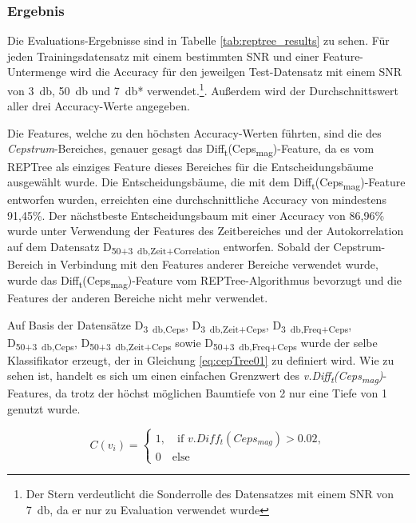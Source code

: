 \subsubsection{Ergebnis} 
\label{sec:vad_result}

Die Evaluations-Ergebnisse  sind in Tabelle \ref{tab:reptree_results} zu sehen. Für jeden Trainingsdatensatz mit einem bestimmten SNR und einer Feature-Untermenge wird die Accuracy für den jeweilgen Test-Datensatz mit einem SNR von \SI{3}{\decibel}, \SI{50}{\decibel} und \SI{7}{\decibel}* verwendet.\footnote{Der Stern verdeutlicht die Sonderrolle des  Datensatzes mit einem SNR von \SI{7}{\decibel}, da er nur zu Evaluation verwendet wurde }. Außerdem wird der Durchschnittswert aller drei Accuracy-Werte angegeben.

Die Features, welche zu den höchsten Accuracy-Werten führten, sind die des \emph{Cepstrum}-Bereiches, genauer gesagt das Diff\textsubscript{t}(Ceps\textsubscript{mag})-Feature, da es vom REPTree als einziges Feature dieses Bereiches für die Entscheidungsbäume ausgewählt wurde. Die Entscheidungsbäume, die mit dem Diff\textsubscript{t}(Ceps\textsubscript{mag})-Feature entworfen wurden, erreichten eine durchschnittliche Accuracy von mindestens 91,45\%. Der nächstbeste Entscheidungsbaum mit einer Accuracy von 86,96\% wurde unter Verwendung der Features des Zeitbereiches und der Autokorrelation auf dem Datensatz D\textsubscript{50+\SI{3}{\decibel},Zeit+Correlation} entworfen. Sobald der Cepstrum-Bereich in Verbindung mit den Features anderer Bereiche verwendet wurde, wurde das Diff\textsubscript{t}(Ceps\textsubscript{mag})-Feature vom REPTree-Algorithmus bevorzugt und die Features der anderen Bereiche nicht mehr verwendet.

Auf Basis der Datensätze D\textsubscript{\SI{3}{\decibel},Ceps}, D\textsubscript{\SI{3}{\decibel},Zeit+Ceps}, D\textsubscript{\SI{3}{\decibel},Freq+Ceps}, D\textsubscript{50+\SI{3}{\decibel},Ceps}, D\textsubscript{50+\SI{3}{\decibel},Zeit+Ceps} sowie D\textsubscript{50+\SI{3}{\decibel},Freq+Ceps} wurde der selbe Klassifikator erzeugt, der in Gleichung \ref{eq:cepTree01} zu definiert wird. Wie zu sehen ist, handelt es sich um einen einfachen Grenzwert des \emph{v.Diff\textsubscript{t}(Ceps\textsubscript{mag})}-Features, da trotz der höchst möglichen Baumtiefe von 2 nur eine Tiefe von 1 genutzt wurde.

\begin{equation}
C(v_i) = \begin{cases}
1, \quad \text{if } v.Diff_t(Ceps_{mag}) > 0.02, \\
0 \quad \text{else}
\end{cases}
\label{eq:cepTree01}
\end{equation}


